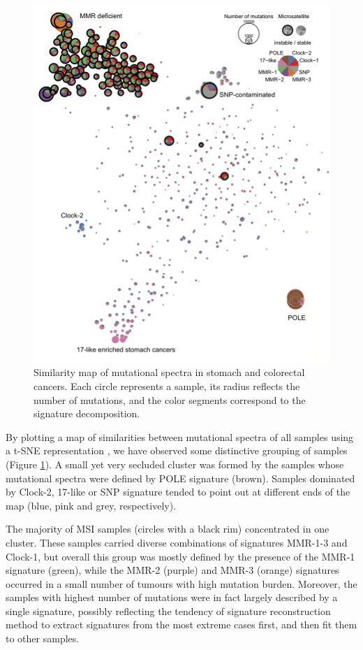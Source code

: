 \begin{figure}
  \centering
\centerline{\includegraphics[width=1\textwidth]{figures/COAD_STAD_tsne.png}}
  \caption{Similarity map of mutational spectra in stomach and colorectal cancers. Each circle represents a sample, its radius reflects the number of mutations, and the color segments correspond to the signature decomposition.}
  \label{COADtsne}
\end{figure}

By plotting a map of similarities between mutational spectra of all samples using a t-SNE 
representation \cite{Maaten2008-de}, we have observed some distinctive grouping of samples
(Figure \ref{COADtsne}). A small yet very secluded cluster was formed by the samples
whose mutational spectra were defined by POLE signature (brown). Samples dominated
by Clock-2, 17-like or SNP signature tended to point out at different ends of the
map (blue, pink and grey, respectively).

The majority of MSI samples (circles with a black rim) concentrated in one cluster. These samples carried
diverse combinations of signatures MMR-1-3 and Clock-1, but overall this group was mostly defined by
the presence of the MMR-1 signature (green), while the MMR-2 (purple) and MMR-3 (orange) signatures occurred
in a small number of tumours with high mutation burden. Moreover, the samples with highest number of 
mutations were in fact largely described by a single signature, possibly reflecting the tendency of 
signature reconstruction method to extract signatures from the most extreme cases first, and
then fit them to other samples.


